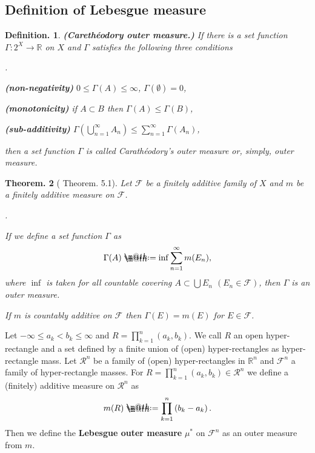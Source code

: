 \documentclass[openany, a4paper, oneside]{jsbook}
\makeatletter
\newcounter{enum2}
\renewenvironment{enumerate}{%
\begin{list}%
{%
\arabic{enum2}.\ \,%
}%
{%
\usecounter{enum2}
\setlength{\itemindent}{0pt}%
\setlength{\leftmargin}{15pt}%
\setlength{\rightmargin}{0pt}%
\setlength{\labelsep}{0pt}%
\setlength{\labelwidth}{6pt}%
\setlength{\itemsep}{0pt}%
\setlength{\parsep}{0pt}%
\setlength{\listparindent}{0pt}%
}
}{%
\end{list}%
}
\newcommand*{\defeq}{\mathrel{\rlap{%
\raisebox{0.3ex}{$\m@th\cdot$}}%
\raisebox{-0.3ex}{$\m@th\cdot$}}%
=}
\theoremstyle{break}
\newtheorem{thm}{Theorem.}[section]
\theoremstyle{breakdefn}
\newtheorem{defn}[thm]{Definition.}
\newcommand{\rbk}[1]{\left (#1\right)}
\newcommand{\bbR}{\mathbb{R}}
\newcommand{\bbRn}{\mathbb{R}^n}
\newcommand{\calF}{\mathcal{F}}
\newcommand{\calR}{\mathcal{R}}
\newcommand{\upbf}[1]{\textup{\textbf{#1}}}
\makeatother
\begin{document}
\subsection{Definition of Lebesgue measure}


\begin{defn}\upbf{(Careth\'eodory outer measure.)}
 If there is a set function $\Gamma \colon 2^X \to \bbR$ on $X$ and $\Gamma$ satisfies the following three conditions
\begin{enumerate}
\item \upbf{(non-negativity)} $0 \leq \Gamma (A) \leq \infty$, $\Gamma (\emptyset) = 0$,
\item \upbf{(monotonicity)} if $A \subset B$ then $\Gamma (A) \leq \Gamma (B)$,
\item \upbf{(sub-additivity)} $\Gamma (\bigcup_{n=1}^{\infty} A_n) \leq \sum_{n=1}^{\infty} \Gamma (A_n)$,
\end{enumerate}
 then a set function $\Gamma$ is called Carath\'eodory's outer measure or, simply, outer measure.
\end{defn}
\begin{thm}[\cite{SeizoIto1} Theorem. 5.1]
 Let $\calF$ be a finitely additive family of $X$ and $m$ be a finitely additive measure on $\calF$.
\begin{enumerate}
\item If we define a set function $\Gamma$ as
    \begin{align}
     \Gamma (A)
     \defeq
     \inf \sum_{n=1}^{\infty} m (E_n),
    \end{align}
    where $\inf$ is taken for all countable covering $A \subset \bigcup E_n$ $(E_n \in \calF)$,
    then $\Gamma$ is an outer measure.
\item If $m$ is countably additive on $\calF$ then $\Gamma (E) = m (E)$ for $E \in \calF$.
\end{enumerate}
\end{thm}
Let $- \infty \leq a_k < b_k \leq \infty$ and $R = \prod_{k=1}^{n} \rbk{a_k, b_k}$.
We call $R$ an open hyper-rectangle and a set defined by a finite union of (open) hyper-rectangles as hyper-rectangle mass.
Let $\calR^n$ be a family of (open) hyper-rectangles in $\bbRn$ and $\calF^n$ a family of hyper-rectangle masses.
For $R = \prod_{k=1}^{n} \rbk{a_k, b_k} \in \calR^n$ we define a (finitely) additive measure on $\calR^n$ as
\begin{align}
 m (R)
 \defeq
 \prod_{k=1}^n \rbk{b_k - a_k}.
\end{align}
Then we define the \upbf{Lebesgue outer measure} $\mu^*$ on $\calF^n$ as an outer measure from $m$.
\end{document}
